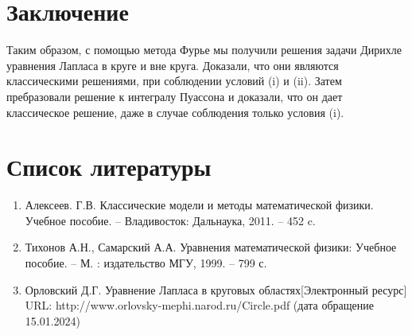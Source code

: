 \documentclass[14pt, a4paper]{extarticle}
\begin{document}
					\section{Заключение}
					Таким образом, с помощью метода Фурье мы получили решения задачи Дирихле уравнения Лапласа в круге и вне круга. Доказали, что они являются классическими решениями, при соблюдении условий (i) и (ii). Затем пребразовали решение к интегралу Пуассона и доказали, что он дает классическое решение, даже в случае соблюдения только условия (i).
					
					\section{Список литературы}
						\begin{enumerate}
							\item Алексеев. Г.В.  Классические модели и методы математической физики. Учебное пособие. -- Владивосток: Дальнаука, 2011. -- 452 c.
							\item Тихонов А.Н., Самарский А.А. Уравнения математической физики: Учебное пособие. -- М. : издательство МГУ, 1999. -- 799 с.
							\item Орловский Д.Г. Уравнение Лапласа в круговых областях[Электронный ресурс] URL: http://www.orlovsky-mephi.narod.ru/Circle.pdf (дата обращение 15.01.2024)
						\end{enumerate}
\end{document}

